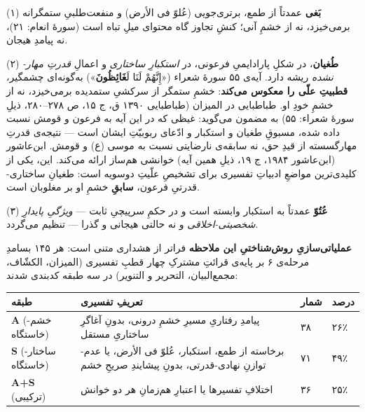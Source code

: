 \begin{RTL}
\begin{otherlanguage}{persian}
(۱) \textbf{بَغی} عمدتاً از طمع، برتری‌جویی (عُلوّ فی الأرض) و منفعت‌طلبیِ
ستمگرانه برمی‌خیزد، نه از خشمِ آنی؛ کنشِ تجاوز گاه محتوای میلِ تباه است
(سورۀ انعام: ۲۱)، نه پیامدِ هیجان.

(۲) \textbf{طُغیان}، در شکلِ پارادایمیِ فرعونی، در \emph{استکبارِ ساختاری} و
اعمالِ \emph{قدرتِ مهار-نشده} ریشه دارد. آیه‌ی ۵۵ سورۀ شعراء («إِنَّهُمْ لَنَا
لَ\textbf{غَائِظُونَ}») به‌گونه‌ای چشمگیر، \textbf{قطبیتِ علّی را معکوس می‌کند}:
خشمِ ستمگر از سرکشیِ ستمدیده برمی‌خیزد، نه از خشمِ خودِ او. طباطبایی در
المیزان (طباطبایی ۱۳۹۰ ق، ج ۱۵، ص ۲۷۸--۲۸۰، ذیلِ سورۀ شعراء: ۵۵) به مضمون
می‌گوید: غیظی که در این آیه به فرعون و قومش نسبت داده شده، مسبوقِ طغیان و
استکبار و ادّعای ربوبیّتِ ایشان است --- نتیجه‌ی قدرتِ مهارگسسته از قیدِ حق، نه
سابقه‌ی نارضایتی نسبت به موسی (ع) و قومش. ابن‌عاشور (ابن‌عاشور ۱۹۸۴، ج ۱۹،
ذیلِ همین آیه) خوانشی هم‌ساز ارائه می‌کند. این، یکی از کلیدی‌ترین مواضعِ
ادبیاتِ تفسیری برای تشخیصِ علّیتِ دوسویه است: طغیانِ ساختاری-قدرتیِ فرعون،
\textbf{سابقِ} خشمِ او بر مغلوبان است.

(۳) \textbf{عُتُوّ} عمدتاً به استکبار وابسته است و در حکمِ سرپیچیِ ثابت ---
\emph{ویژگیِ پایدارِ شخصیتی-اخلاقی} و نه حالتی هیجانی و گذرا --- تنظیم
می‌گردد.

\textbf{عملیاتی‌سازیِ روش‌شناختیِ این ملاحظه} فراتر از هشداری متنی است: هر
۱۴۵ بسامدِ مرحله‌ی ۶ بر پایه‌ی قرائتِ مشترکِ چهار قطبِ تفسیری (المیزان،
الکشّاف، مجمع‌البیان، التحریر و التنویر) در سه طبقه کدبندی شدند:

\begin{longtable}[]{@{}
  >{\centering\arraybackslash}p{}
  >{\raggedright\arraybackslash}p{}
  >{\centering\arraybackslash}p{}
  >{\centering\arraybackslash}p{}@{}}
\toprule\noalign{}
\begin{minipage}[b]{\linewidth}\centering
طبقه
\end{minipage} & \begin{minipage}[b]{\linewidth}\raggedright
تعریفِ تفسیری
\end{minipage} & \begin{minipage}[b]{\linewidth}\centering
شمار
\end{minipage} & \begin{minipage}[b]{\linewidth}\centering
درصد
\end{minipage} \\
\midrule\noalign{}
\endhead
\bottomrule\noalign{}
\endlastfoot
\textbf{A} (خشم-خاستگاه) & پیامدِ رفتاریِ مسیرِ خشمِ درونی، بدونِ آغاگرِ
ساختاریِ مستقل & ۳۸ & ۲۶٪ \\
\textbf{S} (ساختار-خاستگاه) & برخاسته از طمع، استکبار، عُلوّ فی الأرض، یا
عدم-توازنِ نهادی-قدرتی، بدونِ پیشایندِ صریحِ خشم & ۷۱ & ۴۹٪ \\
\textbf{A+S} (ترکیبی) & اختلافِ تفسیرها یا اعتبارِ هم‌زمانِ هر دو خوانش & ۳۶
& ۲۵٪ \\
\end{longtable}


\end{otherlanguage}
\end{RTL}
